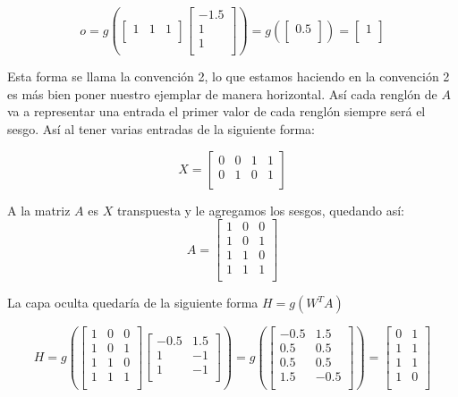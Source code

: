 $$
 o =
 g \left(
 \begin{bmatrix}
  1 & 1 & 1\\
 \end{bmatrix}
 \begin{bmatrix}
  -1.5 \\
  1 \\
  1 \\
 \end{bmatrix}
 \right) = g \left(
 \begin{bmatrix}
  0.5 \\
 \end{bmatrix}
\right) =
 \begin{bmatrix}
  1 \\
 \end{bmatrix}
 $$
 
 
Esta forma se llama la convención 2, lo que estamos haciendo en la convención 2 es más bien poner nuestro ejemplar de manera horizontal. Así cada renglón de $A$ va a representar una entrada el primer valor de cada renglón siempre será el sesgo.
 Así al tener varias entradas de la siguiente forma:
 
 $$
 X =
 \begin{bmatrix}
  0 & 0 & 1 & 1\\
  0 & 1 & 0 & 1\\
 \end{bmatrix}
 $$
 
 A la matriz $A$ es $X$ transpuesta y le agregamos los sesgos, quedando así:
 $$
 A =
 \begin{bmatrix}
  1 & 0 & 0\\
  1 & 0 & 1\\
  1 & 1 & 0\\
  1 & 1 & 1\\
 \end{bmatrix}
 $$
 
 La capa oculta quedaría de la siguiente forma $H = g(W^{T}A)$

 $$
   H
 = g \left(
 \begin{bmatrix}
  1 & 0 & 0\\
  1 & 0 & 1\\
  1 & 1 & 0\\
  1 & 1 & 1\\
 \end{bmatrix} 
 \begin{bmatrix}
  -0.5 & 1.5\\
  1 & -1\\
  1 & -1\\
 \end{bmatrix}
 \right) = g \left(
 \begin{bmatrix}
  -0.5 &  1.5 \\
  0.5 &  0.5 \\
  0.5 &  0.5 \\
  1.5 &  -0.5 \\
 \end{bmatrix}
\right) =
 \begin{bmatrix}
  0 &  1 \\
  1 &  1 \\
  1 &  1 \\
  1 &  0 \\
 \end{bmatrix}
$$


